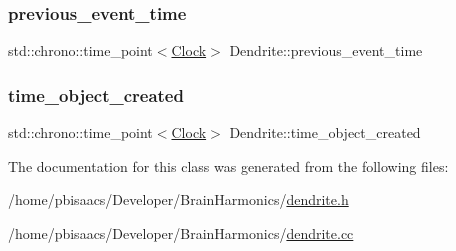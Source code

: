 \mbox{\label{classDendrite_ae4a39c5f211f908eabff9fdd35247f05}} 
\subsubsection{\texorpdfstring{previous\+\_\+event\+\_\+time}{previous\_event\_time}}
{\footnotesize\ttfamily std\+::chrono\+::time\+\_\+point$<$\mbox{\hyperlink{universe_8h_a0ef8d951d1ca5ab3cfaf7ab4c7a6fd80}{Clock}}$>$ Dendrite\+::previous\+\_\+event\+\_\+time\hspace{0.3cm}{\ttfamily [private]}}

\mbox{\label{classDendrite_a21584e5b60195738546123a9ba3c2d6f}} 
\subsubsection{\texorpdfstring{time\+\_\+object\+\_\+created}{time\_object\_created}}
{\footnotesize\ttfamily std\+::chrono\+::time\+\_\+point$<$\mbox{\hyperlink{universe_8h_a0ef8d951d1ca5ab3cfaf7ab4c7a6fd80}{Clock}}$>$ Dendrite\+::time\+\_\+object\+\_\+created\hspace{0.3cm}{\ttfamily [private]}}



The documentation for this class was generated from the following files\+:\begin{DoxyCompactItemize}
\item 
/home/pbisaacs/\+Developer/\+Brain\+Harmonics/\mbox{\hyperlink{dendrite_8h}{dendrite.\+h}}\item 
/home/pbisaacs/\+Developer/\+Brain\+Harmonics/\mbox{\hyperlink{dendrite_8cc}{dendrite.\+cc}}\end{DoxyCompactItemize}
